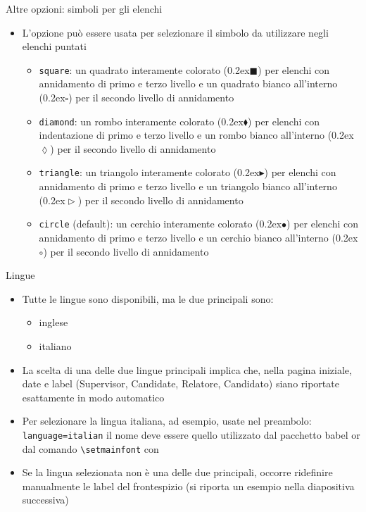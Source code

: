 \begin{frame}[t,fragile]{Altre opzioni: simboli per gli elenchi}
\begin{itemize}
\item L'opzione  può essere usata per selezionare il simbolo da utilizzare negli elenchi puntati
  \begin{itemize}
  \item \verb!square!: un quadrato interamente colorato
        ({\tiny\raise0.2ex\hbox{$\blacksquare$}}) per elenchi con annidamento di primo e terzo livello e un quadrato bianco all'interno
        ({\tiny\raise0.2ex\hbox{$\square$}}) per il secondo livello di annidamento
  \item \verb!diamond!: un rombo interamente colorato
        ({\tiny\raise0.2ex\hbox{$\blacklozenge$}}) per elenchi con indentazione di primo e terzo livello e un rombo bianco all'interno
        ({\tiny\raise0.2ex\hbox{$\lozenge$}}) per il secondo livello di annidamento
  \item \verb!triangle!: un triangolo interamente colorato
        ({\tiny\raise0.2ex\hbox{$\blacktriangleright$}}) per elenchi con annidamento di primo e terzo livello e un triangolo bianco all'interno
        ({\tiny\raise0.2ex\hbox{$\vartriangleright$}}) per il secondo livello di annidamento
  \item \verb!circle! (default): un cerchio interamente colorato
        ({\tiny\raise0.2ex\hbox{$\bullet$}}) per elenchi con annidamento di primo e terzo livello e un cerchio bianco all'interno
        ({\tiny\raise0.2ex\hbox{$\circ$}}) per il secondo livello di annidamento
  \end{itemize}
\end{itemize}
\end{frame}

\begin{frame}[t,fragile]{Lingue}
\begin{itemize}
\item Tutte le lingue sono disponibili, ma le due principali sono:
\begin{itemize}
\item inglese
\item italiano
\end{itemize}
\item La scelta di una delle due lingue principali implica che, nella pagina iniziale, date e label (Supervisor, Candidate, Relatore, Candidato) siano riportate esattamente in modo automatico
\item Per selezionare la lingua italiana, ad esempio, usate nel preambolo:
\verb!language=italian!
il nome deve essere quello utilizzato dal pacchetto babel or dal comando \verb!\setmainfont! con \XeLaTeX
\item Se la lingua selezionata non è una delle due principali, occorre ridefinire manualmente le label del frontespizio (si riporta un esempio nella diapositiva successiva)
\end{itemize}
\end{frame}

